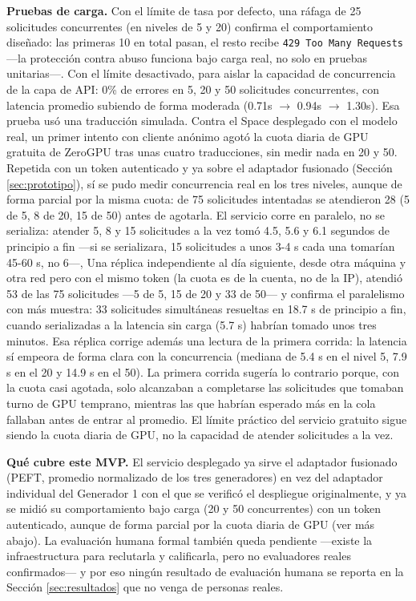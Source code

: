 \documentclass[11pt,a4paper]{article}
\begin{document}
\textbf{Pruebas de carga.} Con el límite de tasa por defecto, una ráfaga de 25 solicitudes concurrentes (en niveles de 5 y 20) confirma el comportamiento diseñado: las primeras 10 en total pasan, el resto recibe \texttt{429 Too Many Requests} —la protección contra abuso funciona bajo carga real, no solo en pruebas unitarias—. Con el límite desactivado, para aislar la capacidad de concurrencia de la capa de API: 0\% de errores en 5, 20 y 50 solicitudes concurrentes, con latencia promedio subiendo de forma moderada (0.71s $\to$ 0.94s $\to$ 1.30s). Esa prueba usó una traducción simulada. Contra el Space desplegado con el modelo real, un primer intento con cliente anónimo agotó la cuota diaria de GPU gratuita de ZeroGPU tras unas cuatro traducciones, sin medir nada en 20 y 50. Repetida con un token autenticado y ya sobre el adaptador fusionado (Sección \ref{sec:prototipo}), sí se pudo medir concurrencia real en los tres niveles, aunque de forma parcial por la misma cuota: de 75 solicitudes intentadas se atendieron 28 (5 de 5, 8 de 20, 15 de 50) antes de agotarla. El servicio corre en paralelo, no se serializa: atender 5, 8 y 15 solicitudes a la vez tomó 4.5, 5.6 y 6.1 segundos de principio a fin —si se serializara, 15 solicitudes a unos 3-4 s cada una tomarían 45-60 s, no 6—, Una réplica independiente al día siguiente, desde otra máquina y otra red pero con el mismo token (la cuota es de la cuenta, no de la IP), atendió 53 de las 75 solicitudes ---5 de 5, 15 de 20 y 33 de 50--- y confirma el paralelismo con más muestra: 33 solicitudes simultáneas resueltas en 18.7 s de principio a fin, cuando serializadas a la latencia sin carga (5.7 s) habrían tomado unos tres minutos. Esa réplica corrige además una lectura de la primera corrida: la latencia sí empeora de forma clara con la concurrencia (mediana de 5.4 s en el nivel 5, 7.9 s en el 20 y 14.9 s en el 50). La primera corrida sugería lo contrario porque, con la cuota casi agotada, solo alcanzaban a completarse las solicitudes que tomaban turno de GPU temprano, mientras las que habrían esperado más en la cola fallaban antes de entrar al promedio. El límite práctico del servicio gratuito sigue siendo la cuota diaria de GPU, no la capacidad de atender solicitudes a la vez.

\textbf{Qué cubre este MVP.} El servicio desplegado ya sirve el adaptador fusionado (PEFT, promedio normalizado de los tres generadores) en vez del adaptador individual del Generador 1 con el que se verificó el despliegue originalmente, y ya se midió su comportamiento bajo carga (20 y 50 concurrentes) con un token autenticado, aunque de forma parcial por la cuota diaria de GPU (ver más abajo). La evaluación humana formal también queda pendiente ---existe la infraestructura para reclutarla y calificarla, pero no evaluadores reales confirmados--- y por eso ningún resultado de evaluación humana se reporta en la Sección \ref{sec:resultados} que no venga de personas reales.
\end{document}
